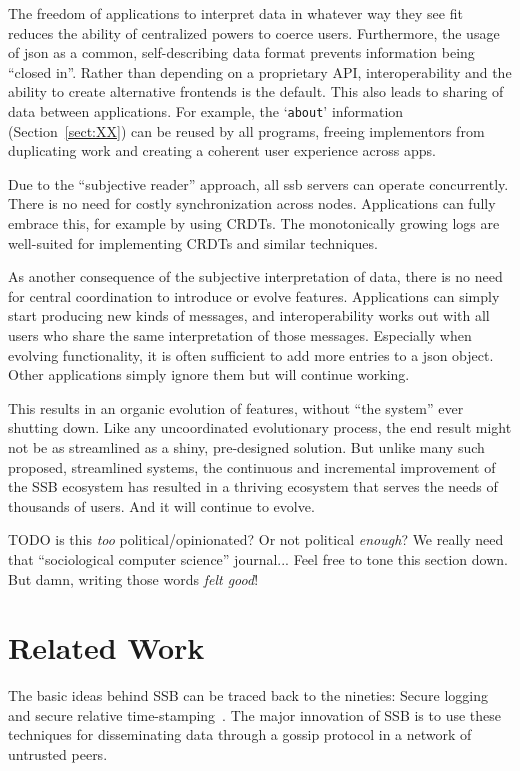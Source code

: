 \documentclass[sigconf]{acmart}
\begin{document}
The freedom of applications to interpret data in whatever way they see fit reduces the ability of centralized powers to coerce users. Furthermore, the usage of json as a common, self-describing data format prevents information being ``closed in''. Rather than depending on a proprietary API, interoperability and the ability to create alternative frontends is the default. This also leads to sharing of data between applications. For example, the `{\small\tt about}' information (Section~\ref{sect:XX}) can be reused by all programs, freeing implementors from duplicating work and creating a coherent user experience across apps.

Due to the ``subjective reader'' approach, all ssb servers can operate concurrently. There is no need for costly synchronization across nodes. Applications can fully embrace this, for example by using CRDTs. The monotonically growing logs are well-suited for implementing CRDTs and similar techniques.

As another consequence of the subjective interpretation of data, there is no need for central coordination to introduce or evolve features. Applications can simply start producing new kinds of messages, and interoperability works out with all users who share the same interpretation of those messages. Especially when evolving functionality, it is often sufficient to add more entries to a json object. Other applications simply ignore them but will continue working.

This results in an organic evolution of features, without ``the system'' ever shutting down. Like any uncoordinated evolutionary process, the end result might not be as streamlined as a shiny, pre-designed solution. But unlike many such proposed, streamlined systems, the continuous and incremental improvement of the SSB ecosystem has resulted in a thriving ecosystem that serves the needs of thousands of users. And it will continue to evolve.

TODO is this \textit{too} political/opinionated? Or not political \textit{enough}? We really need that ``sociological computer science'' journal... Feel free to tone this section down. But damn, writing those words \textit{felt good}!

\section{Related Work}

The basic ideas behind SSB can be traced back to the nineties: Secure logging~\cite{schneier1998cryptographic} and secure relative time-stamping~\cite{haber1990time}. The major innovation of SSB is to use these techniques for disseminating data through a gossip protocol in a network of untrusted peers.
\end{document}
